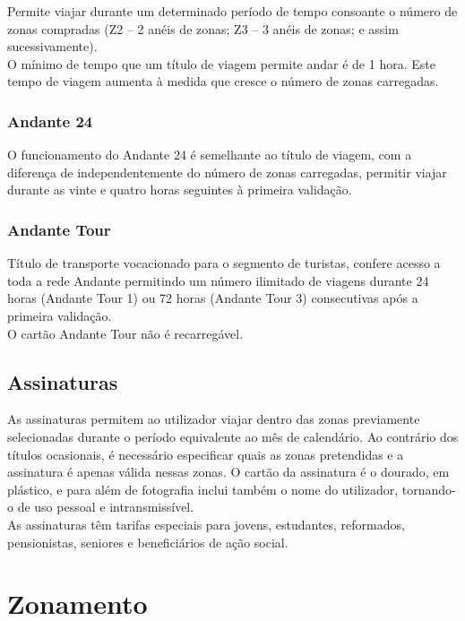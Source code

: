 Permite viajar durante um determinado período de tempo consoante o número de zonas compradas (Z2 – 2 anéis de zonas; Z3 – 3 anéis de zonas; e assim sucessivamente).
\\O mínimo de tempo que um título de viagem permite andar é de 1 hora. Este tempo de viagem aumenta à medida que cresce o número de zonas carregadas.

\subsubsection{Andante 24}

O funcionamento do Andante 24 é semelhante ao título de viagem, com a diferença de independentemente do número de zonas carregadas, permitir viajar durante as vinte e quatro horas seguintes à primeira validação.

\subsubsection{Andante Tour}

Título de transporte vocacionado para o segmento de turistas, confere acesso a toda a rede Andante permitindo um número ilimitado de viagens durante 24 horas (Andante Tour 1) ou 72 horas (Andante Tour 3) consecutivas após a primeira validação.
\\O cartão Andante Tour não é recarregável.


\subsection{Assinaturas}

As assinaturas permitem ao utilizador viajar dentro das zonas previamente selecionadas durante o período equivalente ao mês de calendário. Ao contrário dos títulos ocasionais, é necessário especificar quais as zonas pretendidas e a assinatura é apenas válida nessas zonas. O cartão da assinatura é o dourado, em plástico, e para além de fotografia inclui também o nome do utilizador, tornando-o de uso pessoal e intransmissível.
\\As assinaturas têm tarifas especiais para jovens, estudantes, reformados, pensionistas, seniores e beneficiários de ação social.

\section{Zonamento}

